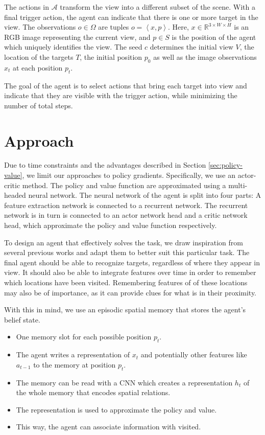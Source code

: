 The actions in \(\mathcal{A}\) transform the view into a different subset of the scene.
With a final trigger action, the agent can indicate that there is one or more target in the view.
The observations \(o \in \Omega\) are tuples \(o = \left\langle x, p \right\rangle\).
Here, \(x \in \mathbb{R}^{3 \times W \times H}\) is an RGB image representing the current view, and \(p \in S\) is the position of the agent which uniquely identifies the view.
The seed \(c\) determines the initial view \(V\), the location of the targets \(T\), the initial position \(p_0\) as well as the image observations \(x_t\) at each position \(p_t\).

The goal of the agent is to select actions that bring each target into view and indicate that they are visible with the trigger action, while minimizing the number of total steps.


\section{Approach}
\label{sec:approach}

Due to time constraints and the advantages described in Section \ref{sec:policy-value}, we limit our approaches to policy gradients.
Specifically, we use an actor-critic method.
The policy and value function are approximated using a multi-headed neural network.
The neural network of the agent is split into four parts:
A feature extraction network is connected to a recurrent network.
The recurrent network is in turn is connected to an actor network head and a critic network head, which approximate the policy and value function respectively.

To design an agent that effectively solves the task, we draw inspiration from several previous works and adapt them to better suit this particular task.
The final agent should be able to recognize targets, regardless of where they appear in view.
It should also be able to integrate features over time in order to remember which locations have been visited.
Remembering features of of these locations may also be of importance, as it can provide clues for what is in their proximity. 

With this in mind, we use an episodic spatial memory that stores the agent's belief state.

\begin{itemize}
    \item One memory slot for each possible position \(p_t\).
    \item The agent writes a representation of \(x_t\) and potentially other features like \(a_{t-1}\) to the memory at position \(p_t\).
    \item The memory can be read with a CNN which creates a representation \(h_t\) of the whole memory that encodes spatial relations.
    \item The representation is used to approximate the policy and value.
    \item This way, the agent can associate information with visited.
\end{itemize}

